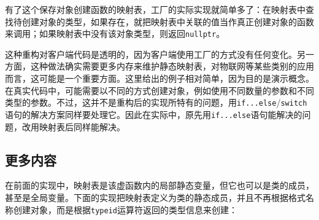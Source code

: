 
有了这个保存对象创建函数的映射表，工厂的实际实现就简单多了：在映射表中查找待创建对象的类型，如果存在，就把映射表中关联的值当作真正创建对象的函数来调用；如果映射表中没有该对象类型，则返回\texttt{nullptr}。



这种重构对客户端代码是透明的，因为客户端使用工厂的方式没有任何变化。另一方面，这种做法确实需要更多内存来维护静态映射表，对物联网等某些类别的应用而言，这可能是一个重要方面。这里给出的例子相对简单，因为目的是演示概念。在真实代码中，可能需要以不同的方式创建对象，例如使用不同数量的参数和不同类型的参数。不过，这并不是重构后的实现所特有的问题，用\texttt{if...\allowbreak{}else}/\texttt{switch}语句的解决方案同样要处理它。因此在实际中，原先用\texttt{if...\allowbreak{}else}语句能解决的问题，改用映射表后同样能解决。



\subsection{更多内容}



在前面的实现中，映射表是该虚函数内的局部静态变量，但它也可以是类的成员，甚至是全局变量。下面的实现把映射表定义为类的静态成员，并且不再根据格式名称创建对象，而是根据\texttt{typeid}运算符返回的类型信息来创建：




